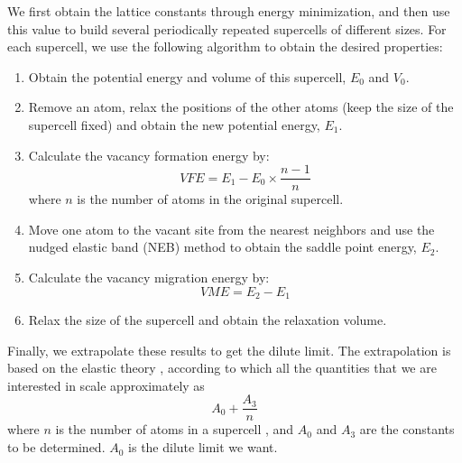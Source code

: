 \documentclass[%
 reprint,
 amsmath,amssymb,
 aps,
]{revtex4-1}
\begin{document}
We first obtain the lattice constants through energy minimization, and then use this value to build several periodically repeated supercells of different sizes.
For each supercell, we use the following algorithm to obtain the desired properties:

\begin{enumerate}
 \item Obtain the potential energy and volume of this supercell, $E_0$ and $V_0$.
 \item Remove an atom, relax the positions of the other atoms (keep the size of the supercell fixed) and obtain the new potential energy, $E_1$.
 \item Calculate the vacancy formation energy by:
 \begin{equation}
 \label{eq:vfecalc}
 \mathit{VFE} = E_1 - E_0 \times \frac{n - 1}{n}
 \end{equation}
 where $n$ is the number of atoms in the original supercell.
 \item Move one atom to the vacant site from the nearest neighbors and use the nudged elastic band (NEB) method to obtain the saddle point energy, $E_2$.
 \item Calculate the vacancy migration energy by:
 \begin{equation}
 \label{eq:vmecalc}
 \mathit{VME} = E_2 - E_1
 \end{equation}
 \item Relax the size of the supercell and obtain the relaxation volume.
\end{enumerate}

Finally, we extrapolate these results to get the dilute limit.
The extrapolation is based on the elastic theory \cite{landau2013course}, according to which all the quantities that we are interested in scale approximately as
\begin{equation}
\label{eq:extrapolation}
A_0 + \frac{A_3}{n}
\end{equation}
where $n$ is the number of atoms in a supercell \cite{freysoldt2014first}, and $A_0$ and $A_3$ are the constants to be determined.
$A_0$ is the dilute limit we want.
\end{document}
